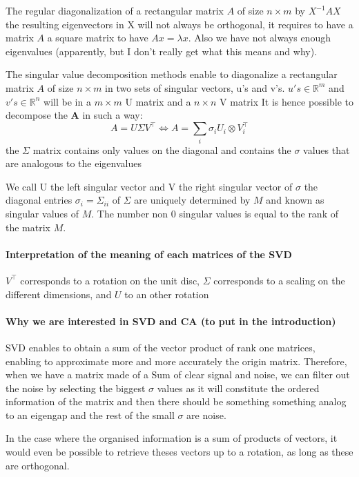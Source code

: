 \documentclass{article}
\begin{document}
The regular diagonalization of a rectangular matrix $A$ of size $n \times m$ by $X^{-1} AX$ the resulting eigenvectors in X will not always be orthogonal, it requires to have a matrix $A$ a square matrix to have $Ax = \lambda x$. Also we have not always enough eigenvalues (apparently, but I don't really get what this means and why).

The singular value decomposition methods enable to diagonalize a rectangular matrix $A$ of size $n \times m$ in two sets of singular vectors, u's and v's. 
$u's \in \mathbb{R}^m$ and $v's \in \mathbb{R}^n$ will be in a $m \times m$ U matrix and a $n \times n$ V matrix
It is hence possible to decompose the $\textbf{A}$ in such a way:
$$A = U \Sigma V^\intercal \Leftrightarrow A = \sum_i \sigma_i U_i \otimes V_i^\intercal$$
the  $\Sigma$ matrix contains only values on the diagonal and contains the $\sigma$ values that are analogous to the eigenvalues 

We call U the left singular vector and V the right singular vector of $\sigma$
the diagonal entries $\sigma_i = \Sigma_{ii}$ of $\Sigma$ are uniquely determined by $M$ and known as singular values of $M$. The number non 0 singular values is equal to the rank of the matrix $M$.

\paragraph{Interpretation of the meaning of each matrices of the SVD}

$V^\intercal$ corresponds to a rotation on the unit disc, $\Sigma$ corresponds to a  scaling on the different dimensions, and $U$ to an other rotation 

\paragraph{Why we are interested in SVD and CA (to put in the introduction)}

SVD enables to obtain a sum of the vector product of rank one matrices, enabling to approximate more and more accurately the origin matrix. Therefore, when we have a matrix made of a Sum of clear signal and noise, we can filter out the noise by selecting the biggest $\sigma$ values as it will constitute the ordered information of the matrix and then there should be something something analog to an eigengap and the rest of the small $\sigma$ are noise.

In the case where the organised information is a sum of products of vectors, it would even be possible to retrieve theses vectors up to a rotation, as long as these are orthogonal.
\end{document}
